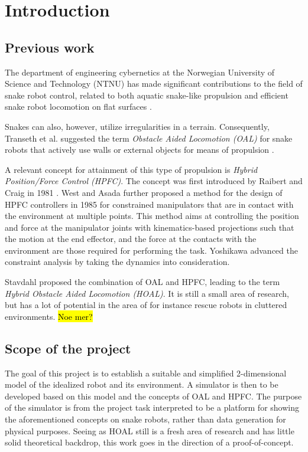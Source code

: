 
\chapter{Introduction}\label{chapter:introduction}

\section{Previous work}
The department of engineering cybernetics at the Norwegian University of Science and Technology (NTNU) has made significant contributions to the field of snake robot control, related to both aquatic snake-like propulsion and efficient snake robot locomotion on flat surfaces \cite{StavdahlNote}.

Snakes can also, however, utilize irregularities in a terrain. Consequently, Transeth et al. suggested the term \textit{Obstacle Aided Locomotion (OAL)} for snake robots that actively use walls or external objects for means of propulsion \cite{transeth2008snake}.

A relevant concept for attainment of this type of propulsion is \textit{Hybrid Position/Force Control (HPFC)}. The concept was first introduced by Raibert and Craig in 1981 \cite{raibert1981hybrid}. West and Asada \cite{west1985method} further proposed a method for the design of HPFC controllers in 1985 for constrained manipulators that are in contact with the environment at multiple points. This method aims at controlling the position and force at the manipulator joints with kinematics-based projections such that the motion at the end effector, and the force at the contacts with the environment are those required for performing the task. Yoshikawa \cite{yoshikawa1987dynamic} advanced the constraint analysis by taking the dynamics into consideration.


Stavdahl \cite{StavdahlNote} proposed the combination of OAL and HPFC, leading to the term \textit{Hybrid Obstacle Aided Locomotion (HOAL)}. It is still a small area of research, but has a lot of potential in the area of for instance rescue robots in cluttered environments. \hl{Noe mer?}

\section{Scope of the project}
The goal of this project is to establish a suitable and simplified 2-dimensional model of the idealized robot and its environment. A simulator is then to be developed based on this model and the concepts of OAL and HPFC. The purpose of the simulator is from the project task interpreted to be a platform for showing the aforementioned concepts on snake robots, rather than data generation for physical purposes.
Seeing as HOAL still is a fresh area of research and has little solid theoretical backdrop, this work goes in the direction of a proof-of-concept.

